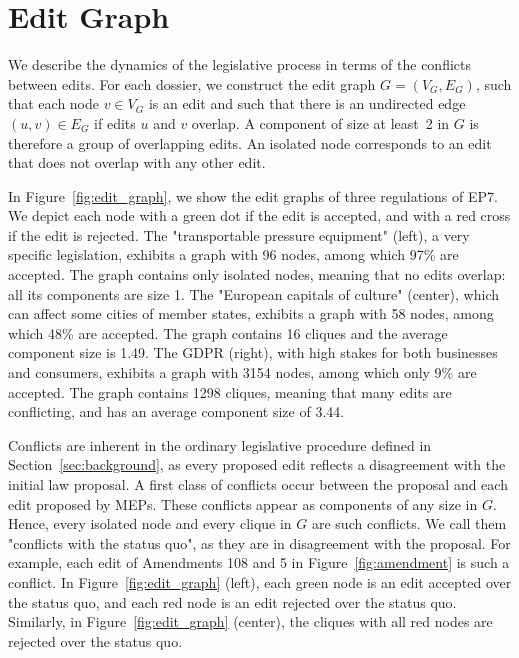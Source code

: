 \section{Edit Graph}
\label{sec:collconf}

We describe the dynamics of the legislative process in terms of the conflicts between edits.
For each dossier, we construct the edit graph $ G = (V_G, E_G) $, such that each node $ v \in V_G $ is an edit and such that there is an undirected edge $ (u, v) \in E_G $ if edits $u$ and $v$ overlap.
A component of size at least~2 in $G$ is therefore a group of overlapping edits. %
An isolated node corresponds to an edit that does not overlap with any other edit.

In Figure~\ref{fig:edit_graph}, we show the edit graphs of three regulations of EP7.
We depict each node with a green dot if the edit is accepted, and with a red cross if the edit is rejected.
The "transportable pressure equipment" (left), a very specific legislation, exhibits a graph with 96 nodes, among which 97\% are accepted.
The graph contains only isolated nodes, meaning that no edits overlap: all its components are size 1.
The "European capitals of culture" (center), which can affect some cities of member states, exhibits a graph with 58 nodes, among which 48\% are accepted.
The graph contains 16 cliques and the average component size is 1.49.
The GDPR (right), with high stakes for both businesses and consumers, exhibits a graph with 3154 nodes, among which only 9\% are accepted.
The graph contains 1298 cliques, meaning that many edits are conflicting, and has an average component size of 3.44.

Conflicts are inherent in the ordinary legislative procedure defined in Section~\ref{sec:background}, as every proposed edit reflects a disagreement with the initial law proposal.
A first class of conflicts occur between the proposal and each edit proposed by MEPs.
These conflicts appear as components of any size in $G$.
Hence, every isolated node and every clique in $G$ are such conflicts.
We call them "conflicts with the status quo", as they are in disagreement with the proposal.
For example, each edit of Amendments 108 and 5 in Figure~\ref{fig:amendment} is such a conflict.
In Figure~\ref{fig:edit_graph} (left), each green node is an edit accepted over the status quo, and each red node is an edit rejected over the status quo.
Similarly, in Figure~\ref{fig:edit_graph} (center), the cliques with all red nodes are rejected over the status quo.

